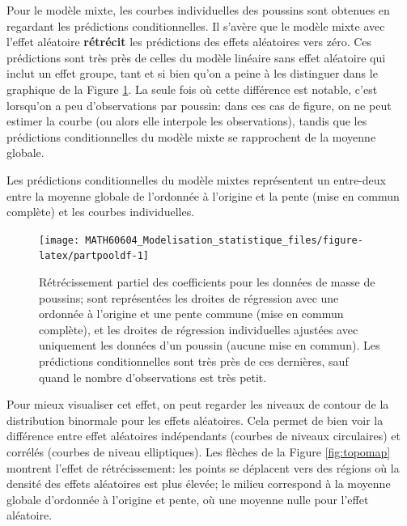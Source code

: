 \documentclass[
  11pt,
  letterpaper,
]{article}
\theoremstyle{definition}
\theoremstyle{definition}
\theoremstyle{definition}
\theoremstyle{definition}
\theoremstyle{remark}
\begin{document}
Pour le modèle mixte, les courbes individuelles des poussins sont obtenues en regardant les prédictions conditionnelles. Il s'avère que le modèle mixte avec l'effet aléatoire \textbf{rétrécit} les prédictions des effets aléatoires vers zéro. Ces prédictions sont très près de celles du modèle linéaire sans effet aléatoire qui inclut un effet groupe, tant et si bien qu'on a peine à les distinguer dans le graphique de la Figure \ref{fig:partpooldf}. La seule fois où cette différence est notable, c'est lorsqu'on a peu d'observations par poussin: dans ces cas de figure, on ne peut estimer la courbe (ou alors elle interpole les observations), tandis que les prédictions conditionnelles du modèle mixte se rapprochent de la moyenne globale.

Les prédictions conditionnelles du modèle mixtes représentent un entre-deux entre la moyenne globale de l'ordonnée à l'origine et la pente (mise en commun complète) et les courbes individuelles.

\begin{figure}

{\centering \texttt{[image: MATH60604\_Modelisation\_statistique\_files/figure-latex/partpooldf-1]} 

}

\caption{Rétrécissement partiel des coefficients pour les données de masse de poussins; sont représentées les droites de régression avec une ordonnée à l'origine et une pente commune (mise en commun complète), et les droites de régression individuelles ajustées avec uniquement les données d'un poussin (aucune mise en commun). Les prédictions conditionnelles sont très près de ces dernières, sauf quand le nombre d'observations est très petit.}\label{fig:partpooldf}
\end{figure}

Pour mieux visualiser cet effet, on peut regarder les niveaux de contour de la distribution binormale pour les effets aléatoires. Cela permet de bien voir la différence entre effet aléatoires indépendants (courbes de niveaux circulaires) et corrélés (courbes de niveau elliptiques). Les flèches de la Figure \ref{fig:topomap} montrent l'effet de rétrécissement: les points se déplacent vers des régions où la densité des effets aléatoires est plus élevée; le milieu correspond à la moyenne globale d'ordonnée à l'origine et pente, où une moyenne nulle pour l'effet aléatoire.
\end{document}
